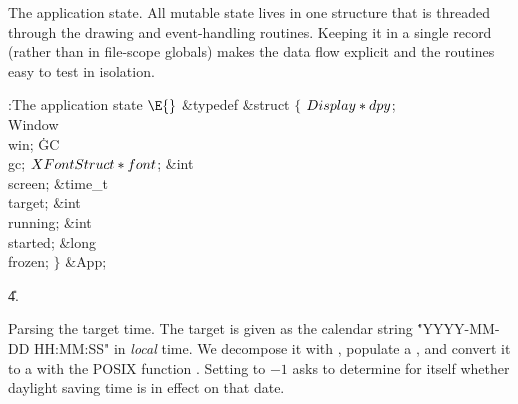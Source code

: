 The application state.
All mutable state lives in one  structure that is threaded through
the drawing and event-handling routines.  Keeping it in a single record
(rather than in file-scope globals) makes the data flow explicit and the
routines easy to test in isolation.

\Y\B\4:The application state \X${}\E{}$\6
\&{typedef} \&{struct} ${}\{{}$\1\6
${}\\{Display}*\\{dpy}{}$;\6
\\{Window}\\{win};\6
\.{GC}\\{gc};\6
${}\\{XFontStruct}*\\{font}{}$;\7
\&{int} \\{screen};\6
\&{time\_t} \\{target};\6
\&{int} \\{running};\6
\&{int} \\{started};\6
\&{long} \\{frozen};\2\6
${}\}{}$ \&{App};\par
\U4.\fi

Parsing the target time.
The target is given as the calendar string \.{"YYYY-MM-DD HH:MM:SS"} in
{\it local\/} time.  We decompose it with , populate a ,
and convert it to a  with the POSIX function .
Setting
 to $-1$ asks  to determine for itself whether
daylight
saving time is in effect on that date.

